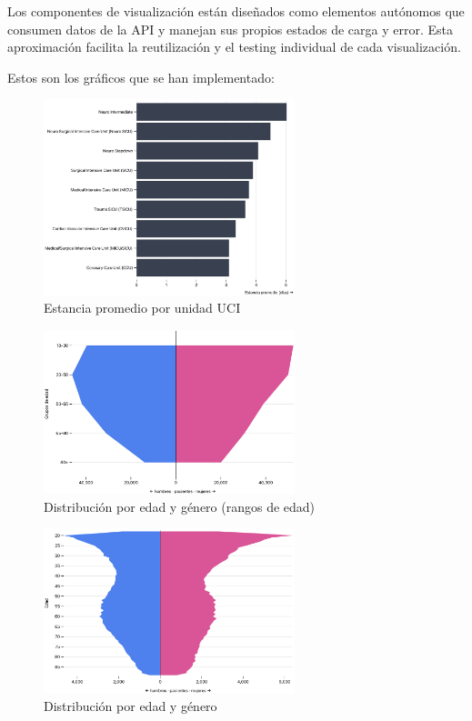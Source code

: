Los componentes de visualización están diseñados como elementos autónomos que consumen datos de la API y manejan sus propios estados de carga y error. Esta aproximación facilita la reutilización y el testing individual de cada visualización.

Estos son los gráficos que se han implementado:



\begin{figure}[H]
  \centering
  \includegraphics[width=0.65\textwidth]{imagenes/chart1.png}
  \caption{Estancia promedio por unidad UCI}
  \label{fig:chart1}
\end{figure}


\begin{figure}[H]
  \centering
  \includegraphics[width=0.65\textwidth]{imagenes/chart2.png}
  \caption{Distribución por edad y género (rangos de edad)}
  \label{fig:chart2}
\end{figure}

\begin{figure}[H]
  \centering
  \includegraphics[width=0.65\textwidth]{imagenes/chart3.png}
  \caption{Distribución por edad y género}
  \label{fig:chart3}
\end{figure}






